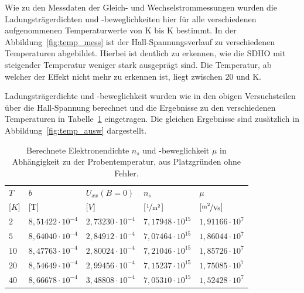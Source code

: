 
Wie zu den Messdaten der Gleich- und Wechselstrommessungen wurden die Ladungsträgerdichten und -beweglichkeiten hier für alle verschiedenen aufgenommenen Temperaturwerte von \unit[2]{K} bis \unit[40]{K} bestimmt. In der Abbildung~\ref{fig:temp_mess} ist der Hall-Spannungsverlauf zu verschiedenen Temperaturen abgebildet. Hierbei ist deutlich zu erkennen, wie die SDHO mit steigender Temperatur weniger stark ausgeprägt sind. Die Temperatur, ab welcher der Effekt nicht mehr zu erkennen ist, liegt zwischen $20$ und \unit[40]{K}.

Ladungsträgerdichte und -beweglichkeit wurden wie in den obigen Versuchsteilen über die Hall-Spannung berechnet und die Ergebnisse zu den verschiedenen Temperaturen in Tabelle~\ref{tab:temp_ausw} eingetragen. Die gleichen Ergebnisse sind zusätzlich in Abbildung~\ref{fig:temp_ausw} dargestellt.

\begin{table}[h]
	\centering
	\begin{tabular}{|l|r|l|r|r|}
		\hline
		\multicolumn{1}{|l|}{\cellcolor{black!30} $T$ } & \multicolumn{1}{|l|}{\cellcolor{black!30} $b$ } & \multicolumn{1}{|l|}{\cellcolor{black!30} $U_{xx}(B=0)$ } & \multicolumn{1}{|l|}{\cellcolor{black!30} $n_s$ } & \multicolumn{1}{|l|}{\cellcolor{black!30} $\mu$ } \\
		\multicolumn{1}{|l|}{\cellcolor{black!30} [$\unit{K}$] } &  \multicolumn{1}{|l|}{\cellcolor{black!30} [\unit{T}] } &
		\multicolumn{1}{|l|}{\cellcolor{black!30} [$\unit{V}$] } &  \multicolumn{1}{|l|}{\cellcolor{black!30} [$\unitfrac{1}{m^2}$] } & \multicolumn{1}{|l|}{\cellcolor{black!30} [$\unitfrac{m^2}{Vs}$] } \\ \hline
		$ 2 $  & $ 8,51422\cdot 10^{-4} $  & $ 2,73230\cdot 10^{-4} $  & $ 7,17948\cdot 10^{15} $  & $ 1,91166\cdot 10^{7} $  \\ 
		$ 5 $  & $ 8,64040\cdot 10^{-4} $  & $ 2,84912\cdot 10^{-4} $  & $ 7,07464\cdot 10^{15} $  & $ 1,86044\cdot 10^{7} $  \\ 
		$ 10 $  & $ 8,47763\cdot 10^{-4} $  & $ 2,80024\cdot 10^{-4} $  & $ 7,21046\cdot 10^{15} $  & $ 1,85726\cdot 10^{7} $  \\ 
		$ 20 $  & $ 8,54649\cdot 10^{-4} $  & $ 2,99456\cdot 10^{-4} $  & $ 7,15237\cdot 10^{15} $  & $ 1,75085\cdot 10^{7} $  \\ 
		$ 40 $  & $ 8,66678\cdot 10^{-4} $  & $ 3,48808\cdot 10^{-4} $  & $ 7,05310\cdot 10^{15} $  & $ 1,52428\cdot 10^{7} $  \\ \hline
	\end{tabular}
	\caption{Berechnete Elektronendichte $n_s$ und -beweglichkeit $\mu$ in Abhängigkeit zu der Probentemperatur, aus Platzgründen ohne Fehler.}
	\label{tab:temp_ausw}
\end{table}

